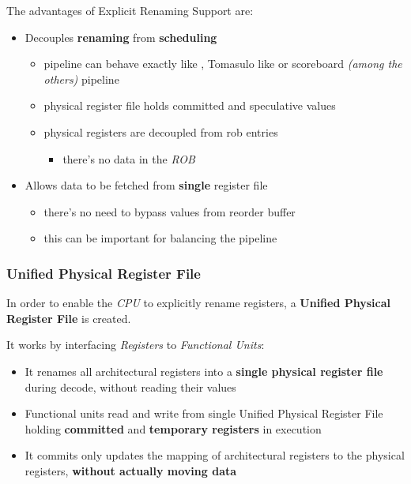 \documentclass[english]{article}
\begin{document}
The advantages of Explicit Renaming Support are:

\begin{itemize}
  \item Decouples \textbf{renaming} from \textbf{scheduling}
        \begin{itemize}
          \item pipeline can behave exactly like , Tomasulo like or scoreboard \textit{(among the others)} pipeline
          \item physical register file holds committed and speculative values
          \item physical registers are decoupled from rob entries
                \begin{itemize}
                  \item there's no data in the \textit{ROB}
                \end{itemize}
        \end{itemize}
  \item Allows data to be fetched from \textbf{single} register file
        \begin{itemize}
          \item there's no need to bypass values from reorder buffer
          \item this can be important for balancing the pipeline
        \end{itemize}
\end{itemize}

\subsubsection{Unified Physical Register File}

In order to enable the \textit{CPU} to explicitly rename registers, a \textbf{Unified Physical Register File} is created.

It works by interfacing \textit{Registers} to \textit{Functional Units}:

\begin{itemize}
  \item It renames all architectural registers into a \textbf{single physical register file} during decode, without reading their values
  \item Functional units read and write from single Unified Physical Register File holding \textbf{committed} and \textbf{temporary registers} in execution
  \item It commits only updates the mapping of architectural registers to the physical registers, \textbf{without actually moving data}
\end{itemize}
\end{document}
